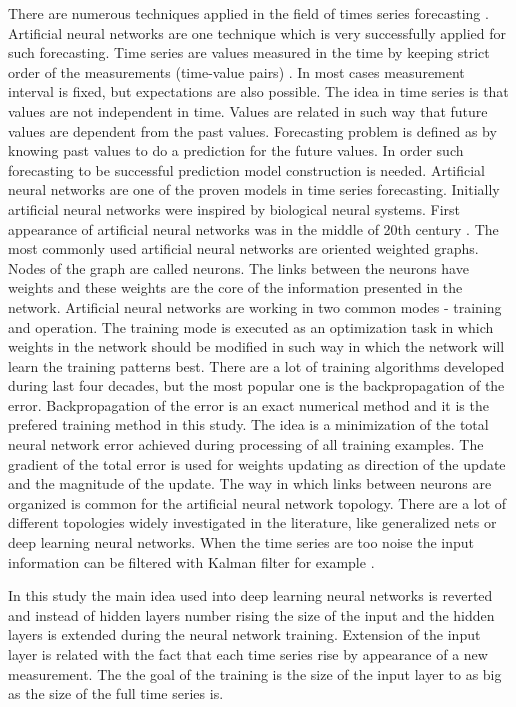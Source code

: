 \documentclass[11pt]{article}
\begin{document}
There are numerous techniques applied in the field of times series forecasting \cite{atanasova01}. Artificial neural networks are one technique which is very successfully applied for such forecasting. Time series are values measured in the time by keeping strict order of the measurements (time-value pairs) \cite{balabanov01}. In most cases measurement interval is fixed, but expectations are also possible. The idea in time series is that values are not independent in time. Values are related in such way that future values are dependent from the past values. Forecasting problem is defined as by knowing past values to do a prediction for the future values. In order such forecasting to be successful prediction model construction is needed. Artificial neural networks are one of the proven models in time series forecasting. Initially artificial neural networks were inspired by biological neural systems. First appearance of artificial neural networks was in the middle of 20th century \cite{balabanov02}. The most commonly used artificial neural networks are oriented weighted graphs. Nodes of the graph are called neurons. The links between the neurons have weights and these weights are the core of the information presented in the network. Artificial neural networks are working in two common modes - training and operation. The training mode is executed as an optimization task in which weights in the network should be modified in such way in which the network will learn the training patterns best. There are a lot of training algorithms developed during last four decades, but the most popular one is the backpropagation of the error. Backpropagation of the error is an exact numerical method and it is the prefered training method in this study. The idea is a minimization of the total neural network error achieved during processing of all training examples. The gradient of the total error is used for weights updating as direction of the update and the magnitude of the update. The way in which links between neurons are organized is common for the artificial neural network topology. There are a lot of different topologies widely investigated in the literature, like generalized nets \cite{tashev01} or deep learning neural networks. When the time series are too noise the input information can be filtered with Kalman filter for example \cite{alexandrov01}. 

In this study the main idea used into deep learning neural networks is reverted and instead of hidden layers number rising the size of the input and the hidden layers is extended during the neural network training. Extension of the input layer is related with the fact that each time series rise by appearance of a new measurement. The the goal of the training is the size of the input layer to as big as the size of the full time series is. 
\end{document}
